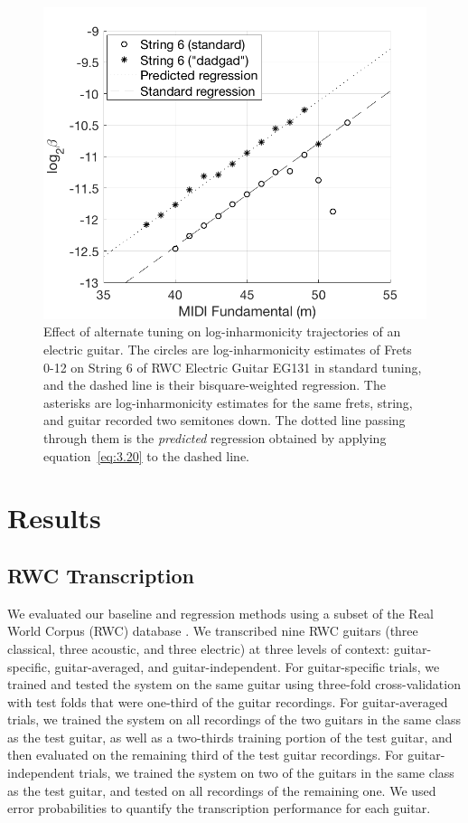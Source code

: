 \documentclass[convention,peer-reviewed]{aesconf}
\begin{document}
\begin{figure}[!htbp] 
\label{fig:tuning-eg}
\centering
\includegraphics[scale=0.25]{tuning-eg}
%
\caption{Effect of alternate tuning on log-inharmonicity trajectories of an electric guitar. The circles are log-inharmonicity estimates of Frets 0-12 on String 6 of RWC Electric Guitar EG131 in standard tuning, and the dashed line is their bisquare-weighted regression. The asterisks are log-inharmonicity estimates for the same frets, string, and guitar recorded two semitones down. The dotted line passing through them is the \textit{predicted} regression obtained by applying equation~\eqref{eq:3.20} to the dashed line.}
\end{figure}

\section{Results}  
\subsection{RWC Transcription}
We evaluated our baseline and regression methods using a subset of the Real World Corpus (RWC) database \citep{goto2003}. We transcribed nine RWC guitars (three classical, three acoustic, and three electric) at three levels of context: guitar-specific, guitar-averaged, and guitar-independent. For guitar-specific trials, we trained and tested the system on the same guitar using three-fold cross-validation with test folds that were one-third of the guitar recordings. For guitar-averaged trials, we trained the system on all recordings of the two guitars in the same class as the test guitar, as well as a two-thirds training portion of the test guitar, and then evaluated on the remaining third of the test guitar recordings. For guitar-independent trials, we trained the system on two of the guitars in the same class as the test guitar, and tested on all recordings of the remaining one. We used error probabilities to quantify the transcription performance for each guitar.
\end{document}
